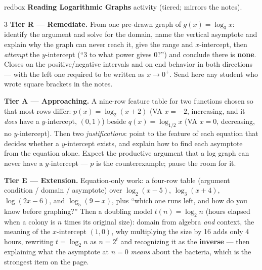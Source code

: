 \documentclass[10pt]{article}
\begin{document}
\begin{skillbox}{redbox}
\textbf{Reading Logarithmic Graphs} activity (tiered; mirrors the notes).
\begin{multicols}{3}
\textbf{Tier R --- Remediate.} From one pre-drawn graph of $g(x)=\log_3 x$: identify the argument and
solve for the domain, name the vertical asymptote and explain why the graph can never reach it, give
the range and $x$-intercept, then \emph{attempt} the $y$-intercept (``3 to what power gives 0?'') and
conclude there is \textbf{none}. Closes on the positive/negative intervals and on end behavior in
both directions --- with the left one required to be written as $x\to 0^{+}$. Send here any student
who wrote square brackets in the notes.

\columnbreak
\textbf{Tier A --- Approaching.} A nine-row feature table for two functions chosen so that most rows
differ: $p(x)=\log_2(x+2)$ (VA $x=-2$, increasing, and it \emph{does} have a $y$-intercept, $(0,1)$)
beside $q(x)=\log_{1/2}x$ (VA $x=0$, decreasing, no $y$-intercept). Then two \emph{justifications}:
point to the feature of each equation that decides whether a $y$-intercept exists, and explain how to
find each asymptote from the equation alone. Expect the productive argument that a log graph can
never have a $y$-intercept --- $p$ is the counterexample; pause the room for it.

\columnbreak
\textbf{Tier E --- Extension.} Equation-only work: a four-row table (argument condition / domain /
asymptote) over $\log_2(x-5)$, $\log_3(x+4)$, $\log(2x-6)$, and $\log_5(9-x)$, plus ``which one runs
left, and how do you know before graphing?'' Then a doubling model $t(n)=\log_2 n$ (hours elapsed
when a colony is $n$ times its original size): domain from algebra \emph{and} context, the meaning of
the $x$-intercept $(1,0)$, why multiplying the size by 16 adds only 4 hours, rewriting
$t=\log_2 n$ as $n=2^t$ and recognizing it as the \textbf{inverse} --- then explaining what the
asymptote at $n=0$ \emph{means} about the bacteria, which is the strongest item on the page.
\end{multicols}
\end{skillbox}
\end{document}
